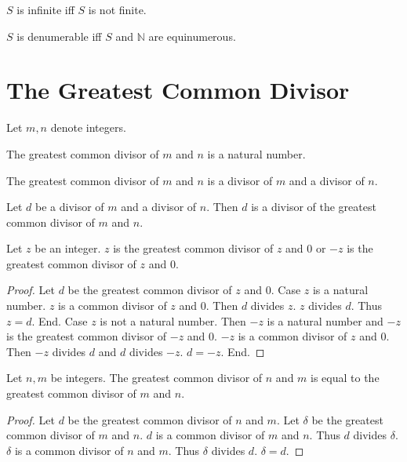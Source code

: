\documentclass{article}
\begin{document}
\begin{forthel}
\begin{definition}
$S$ is infinite iff $S$ is not finite.
\end{definition}

\begin{definition}
$S$ is denumerable iff $S$ and $\mathbb{N}$ are equinumerous.
\end{definition}
\end{forthel}


\section{The Greatest Common Divisor}

\begin{forthel}

Let $m,n$ denote integers.


\begin{signature}
The greatest common divisor of $m$ and $n$ is a natural number.
\end{signature}

\begin{axiom}
The greatest common divisor of $m$ and $n$ is a divisor of $m$ and a divisor of $n$.
\end{axiom}

\begin{axiom}
Let $d$ be a divisor of $m$ and a divisor of $n$.
Then $d$ is a divisor of the greatest common divisor of $m$ and $n$.
\end{axiom}


\begin{lemma}
Let $z$ be an integer.
$z$ is the greatest common divisor of $z$ and $0$ or $-z$ is the greatest common divisor of $z$ and $0$.
\end{lemma}
\begin{proof}
Let $d$ be the greatest common divisor of $z$ and $0$.
Case $z$ is a natural number. $z$ is a common divisor of $z$ and $0$. 
  Then $d$ divides $z$. $z$ divides $d$. Thus $z = d$. End.
Case $z$ is not a natural number. Then $-z$ is a natural number and $-z$ is the greatest common divisor of $-z$ and $0$.
  $-z$ is a common divisor of $z$ and $0$. Then $-z$ divides $d$ and $d$ divides $-z$. $d = -z$.
End.
\end{proof}


\begin{lemma}
Let $n,m$ be integers. The greatest common divisor of $n$ and $m$ is equal to
the greatest common divisor of $m$ and $n$.
\end{lemma}
\begin{proof}
Let $d$ be the greatest common divisor of $n$ and $m$.
Let $\delta$ be the greatest common divisor of $m$ and $n$.
$d$ is a common divisor of $m$ and $n$. Thus $d$ divides $\delta$. 
$\delta$ is a common divisor of $n$ and $m$. Thus $\delta$ divides $d$. $\delta = d$.
\end{proof}


\end{forthel}
\end{document}
